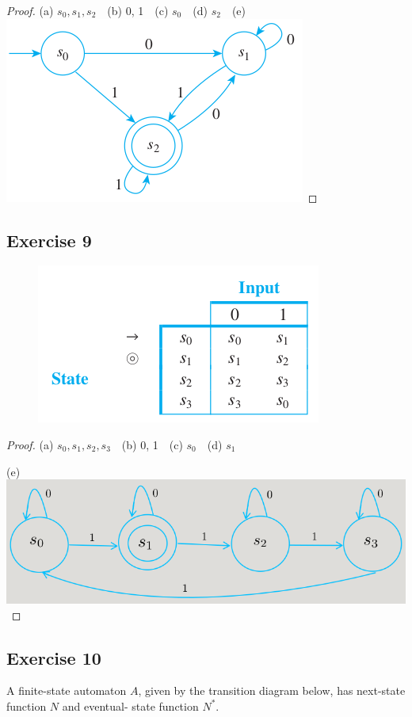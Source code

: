 \documentclass[14pt]{extarticle}
\begin{document}
\begin{proof}
(a) \(s_0, s_1, s_2\) \,\, (b) 0, 1 \,\, (c) \(s_0\) \,\, (d) \(s_2\) \,\, (e)
\includegraphics[scale=0.5]{../images/12.2.8.e.png}
\end{proof}

\subsection{Exercise 9}
\begin{figure}[ht!]
\centering
\includegraphics[scale=0.5]{../images/12.2.9.png}
\end{figure}

\begin{proof}
(a) \(s_0, s_1, s_2, s_3\) \,\, (b) 0, 1 \,\, (c) \(s_0\) \,\, (d) \(s_1\) \,\, 

(e) \includegraphics[scale=0.4]{../images/12.2.9.e.png}
\end{proof}

\subsection{Exercise 10}
A finite-state automaton \(A\), given by the transition diagram below, has next-state function \(N\) and eventual-
state function \(N^*\).
\end{document}
